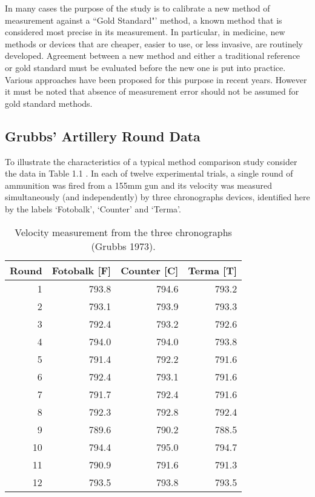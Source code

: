 \documentclass[12pt, a4paper]{report}
\theoremstyle{plain}
\theoremstyle{definition}
\theoremstyle{remark}
\begin{document}
	In many cases the purpose of the study is to calibrate a new method of measurement against a ``Gold Standard"’ method, a known method that is considered most precise in its measurement. In particular, in medicine, new methods or devices that are cheaper, easier to use, or less invasive, are routinely developed. Agreement between a new method and either a traditional reference or gold standard must be evaluated before the new one is put into practice. Various approaches have been proposed for this purpose in recent years. However it must be noted that absence of measurement error should not be assumed for gold standard methods.
	
	
\subsection{Grubbs' Artillery Round Data}	

	To illustrate the characteristics of a typical method comparison
	study consider the data in Table 1.1 \citep{Grubbs73}. In each of
	twelve experimental trials, a single round of ammunition was fired
	from a 155mm gun and its velocity was measured simultaneously (and
	independently) by three chronographs devices, identified here by
	the labels `Fotobalk', `Counter' and `Terma'.
	\smallskip
	
	
	\begin{table}[ht]
		\begin{center}
			\begin{tabular}{rrrr}
				\hline
				Round& Fotobalk [F] & Counter [C]& Terma [T]\\
				\hline
				1 & 793.8 & 794.6 & 793.2 \\
				2 & 793.1 & 793.9 & 793.3 \\
				3 & 792.4 & 793.2 & 792.6 \\
				4 & 794.0 & 794.0 & 793.8 \\
				5 & 791.4 & 792.2 & 791.6 \\
				6 & 792.4 & 793.1 & 791.6 \\
				7 & 791.7 & 792.4 & 791.6 \\
				8 & 792.3 & 792.8 & 792.4 \\
				9 & 789.6 & 790.2 & 788.5 \\
				10 & 794.4 & 795.0 & 794.7 \\
				11 & 790.9 & 791.6 & 791.3 \\
				12 & 793.5 & 793.8 & 793.5 \\
				\hline
			\end{tabular}
			\caption{Velocity measurement from the three chronographs (Grubbs
				1973).}
		\end{center}
		\label{FCTdata}
	\end{table}
	
\end{document}
